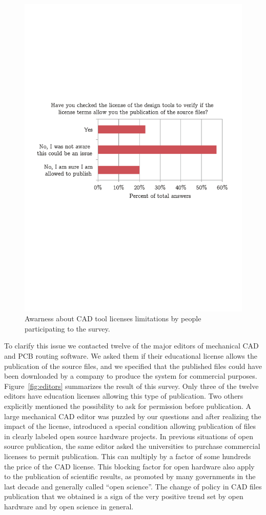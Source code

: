 \documentclass[letterpaper, 10 pt, conference]{ieeeconf}  %
\begin{document}
\begin{figure}
\centering
\includegraphics[width=\columnwidth]{figures/checklicense}
\caption{Awarness about CAD tool licenses limitations by people participating to the survey.}
\label{fig:aware}
\end{figure}

To clarify this issue we contacted twelve of the major editors of mechanical CAD and PCB routing software.
We asked them if their educational license allows the publication of the source files, and we specified that the published files could have been downloaded by a company to produce the system for commercial purposes.
Figure~\ref{fig:editors} summarizes the result of this survey.
Only three of the twelve editors have education licenses allowing this type of publication. 
Two others explicitly mentioned the possibility to ask for permission before publication.
A large mechanical CAD editor was puzzled by our questions and after realizing the impact of the license, introduced a special condition allowing publication of files in clearly labeled open source hardware projects.
In previous situations of open source publication, the same editor asked the universities to purchase commercial licenses to permit publication.
This can multiply by a factor of some hundreds the price of the CAD license.
This blocking factor for open hardware also apply to the publication of scientific results, as promoted by many governments in the last decade and generally called ``open science''.
The change of policy in CAD files publication that we obtained is a sign of the very positive trend set by open hardware and by open science in general.
\end{document}
